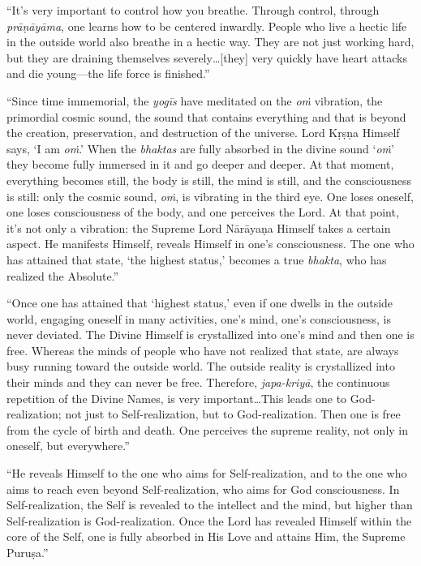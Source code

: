 \documentclass[12pt, twoside, openright]{memoir}
\begin{document}
\enquote{It’s very important to control how you breathe. Through control, through \textit{prāṇāyāma}, one learns how to be centered inwardly. People who live a hectic life in the outside world also breathe in a hectic way. They are not just working hard, but they are draining themselves severely\ldots [they] very quickly have heart attacks and die young---the life force is finished.}

\enquote{Since time immemorial, the \textit{yogīs} have meditated on the \textit{oṁ} vibration, the primordial cosmic sound, the sound that contains everything and that is beyond the creation, preservation, and destruction of the universe. Lord Kṛṣṇa Himself says, \enquote{I am \textit{oṁ}.} When the \textit{bhaktas} are fully absorbed in the divine sound \enquote{\textit{oṁ}} they become fully immersed in it and go deeper and deeper. At that moment, everything becomes still, the body is still, the mind is still, and the consciousness is still: only the cosmic sound, \textit{oṁ}, is vibrating in the third eye. One loses oneself, one loses consciousness of the body, and one perceives the Lord. At that point, it’s not only a vibration: the Supreme Lord Nārāyaṇa Himself takes a certain aspect. He manifests Himself, reveals Himself in one’s consciousness. The one who has attained that state, \enquote{the highest status,} becomes a true \textit{bhakta}, who has realized the Absolute.}

\enquote{Once one has attained that \enquote{highest status,} even if one dwells in the outside world, engaging oneself in many activities, one’s mind, one’s consciousness, is never deviated. The Divine Himself is crystallized into one’s mind and then one is free. Whereas the minds of people who have not realized that state, are always busy running toward the outside world. The outside reality is crystallized into their minds and they can never be free. Therefore, \textit{japa-kriyā}, the continuous repetition of the Divine Names, is very important\ldots This leads one to God-realization; not just to Self-realization, but to God-realization. Then one is free from the cycle of birth and death. One perceives the supreme reality, not only in oneself, but everywhere.}

\enquote{He reveals Himself to the one who aims for Self-realization, and to the one who aims to reach even beyond Self-realization, who aims for God consciousness. In Self-realization, the Self is revealed to the intellect and the mind, but higher than Self-realization is God-realization. Once the Lord has revealed Himself within the core of the Self, one is fully absorbed in His Love and attains Him, the Supreme Puruṣa.}
\end{document}
